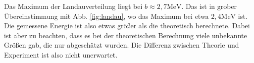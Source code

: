 Das Maximum der Landauverteilung liegt bei $b \approx 2,7\si{\mega\eV}$. Das ist in grober Übereinstimmung mit Abb. \ref{fig:landau}, wo das Maximum bei etwa $2,4\si{\mega\eV}$ ist. Die gemessene Energie ist also etwas größer als die theoretisch berechnete. Dabei ist aber zu beachten, dass es bei der theoretischen Berechnung viele unbekannte Größen gab, die nur abgeschätzt wurden. Die Differenz zwischen Theorie und Experiment ist also nicht unerwartet.
